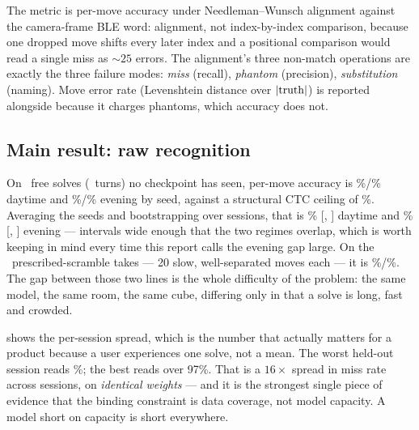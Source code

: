 The metric is per-move accuracy under Needleman--Wunsch alignment against the
camera-frame BLE word: alignment, not index-by-index comparison, because one
dropped move shifts every later index and a positional comparison would read
a single miss as ${\sim}25$ errors. The alignment's three non-match
operations are exactly the three failure modes: \emph{miss} (recall),
\emph{phantom} (precision), \emph{substitution} (naming). Move error rate
(Levenshtein distance over $|{\rm truth}|$) is reported alongside because it
charges phantoms, which accuracy does not.

\subsection{Main result: raw recognition}
\label{sec:main-results}

\begin{table}[t]
\centering\small
\caption{Raw CTC recognition on the never-seen holdout, mean of per-session
accuracies. The CTC ceiling column is the structural limit from
\cref{sec:ctc-bg} --- same-class onset pairs within two frames, which no
amount of training removes.}
\label{tab:main}

\end{table}

On \NHoldoutSolves\ free solves (\NHoldoutMoves\ turns) no checkpoint has
seen, per-move accuracy is \RawDaySA\%/\RawDaySB\% daytime and
\RawEveSA\%/\RawEveSB\% evening by seed, against a structural CTC ceiling
of \CTCCeilingHoldout\%. Averaging the seeds and bootstrapping over
sessions, that is \CIDayMean\% [\CIDayLo, \CIDayHi] daytime and
\CIEveMean\% [\CIEveLo, \CIEveHi] evening --- intervals wide enough that
the two regimes overlap, which is worth keeping in mind every time this
report calls the evening gap large.
On the \NHoldoutScrambles\ prescribed-scramble
takes --- 20 slow, well-separated moves each --- it is \ScrSA\%/\ScrSB\%.
The gap between those two lines is the whole difficulty of the problem: the
same model, the same room, the same cube, differing only in that a solve is
long, fast and crowded.

 shows the per-session spread, which is the number that
actually matters for a product because a user experiences one solve, not a
mean. The worst held-out session reads \RawMinSA\%; the best reads over
97\%. That is a $16\times$ spread in miss rate across sessions, on
\emph{identical weights} --- and it is the strongest single piece of evidence
that the binding constraint is data coverage, not model capacity. A model
short on capacity is short everywhere.

